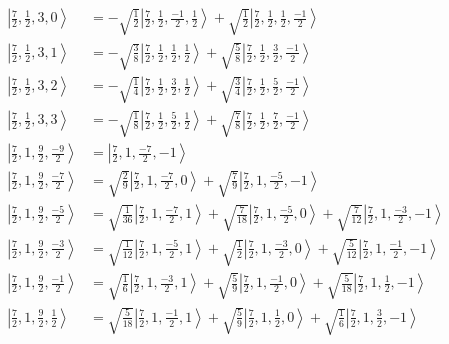 \documentclass{report}
\newcommand{\ket}[1]{\left| #1 \right>} %
\begin{document}
\begin{align*}
\ket{ \frac{7}{2} ,  \frac{1}{2} ,  3 ,  0  } &=  - \sqrt{  \frac{1}{2}  } \ket{ \frac{7}{2} ,  \frac{1}{2} ,  \frac{-1}{2} ,  \frac{1}{2}  } + \sqrt{  \frac{1}{2}  } \ket{ \frac{7}{2} ,  \frac{1}{2} ,  \frac{1}{2} ,  \frac{-1}{2}  } \\
\ket{ \frac{7}{2} ,  \frac{1}{2} ,  3 ,  1  } &=  - \sqrt{  \frac{3}{8}  } \ket{ \frac{7}{2} ,  \frac{1}{2} ,  \frac{1}{2} ,  \frac{1}{2}  } + \sqrt{  \frac{5}{8}  } \ket{ \frac{7}{2} ,  \frac{1}{2} ,  \frac{3}{2} ,  \frac{-1}{2}  } \\
\ket{ \frac{7}{2} ,  \frac{1}{2} ,  3 ,  2  } &=  - \sqrt{  \frac{1}{4}  } \ket{ \frac{7}{2} ,  \frac{1}{2} ,  \frac{3}{2} ,  \frac{1}{2}  } + \sqrt{  \frac{3}{4}  } \ket{ \frac{7}{2} ,  \frac{1}{2} ,  \frac{5}{2} ,  \frac{-1}{2}  } \\
\ket{ \frac{7}{2} ,  \frac{1}{2} ,  3 ,  3  } &=  - \sqrt{  \frac{1}{8}  } \ket{ \frac{7}{2} ,  \frac{1}{2} ,  \frac{5}{2} ,  \frac{1}{2}  } + \sqrt{  \frac{7}{8}  } \ket{ \frac{7}{2} ,  \frac{1}{2} ,  \frac{7}{2} ,  \frac{-1}{2}  } \\
\ket{ \frac{7}{2} ,  1 ,  \frac{9}{2} ,  \frac{-9}{2}  } &=  \ket{ \frac{7}{2} ,  1 ,  \frac{-7}{2} ,  -1  } \\
\ket{ \frac{7}{2} ,  1 ,  \frac{9}{2} ,  \frac{-7}{2}  } &=  \sqrt{  \frac{2}{9}  } \ket{ \frac{7}{2} ,  1 ,  \frac{-7}{2} ,  0  } + \sqrt{  \frac{7}{9}  } \ket{ \frac{7}{2} ,  1 ,  \frac{-5}{2} ,  -1  } \\
\ket{ \frac{7}{2} ,  1 ,  \frac{9}{2} ,  \frac{-5}{2}  } &=  \sqrt{  \frac{1}{36}  } \ket{ \frac{7}{2} ,  1 ,  \frac{-7}{2} ,  1  } + \sqrt{  \frac{7}{18}  } \ket{ \frac{7}{2} ,  1 ,  \frac{-5}{2} ,  0  } + \sqrt{  \frac{7}{12}  } \ket{ \frac{7}{2} ,  1 ,  \frac{-3}{2} ,  -1  } \\
\ket{ \frac{7}{2} ,  1 ,  \frac{9}{2} ,  \frac{-3}{2}  } &=  \sqrt{  \frac{1}{12}  } \ket{ \frac{7}{2} ,  1 ,  \frac{-5}{2} ,  1  } + \sqrt{  \frac{1}{2}  } \ket{ \frac{7}{2} ,  1 ,  \frac{-3}{2} ,  0  } + \sqrt{  \frac{5}{12}  } \ket{ \frac{7}{2} ,  1 ,  \frac{-1}{2} ,  -1  } \\
\ket{ \frac{7}{2} ,  1 ,  \frac{9}{2} ,  \frac{-1}{2}  } &=  \sqrt{  \frac{1}{6}  } \ket{ \frac{7}{2} ,  1 ,  \frac{-3}{2} ,  1  } + \sqrt{  \frac{5}{9}  } \ket{ \frac{7}{2} ,  1 ,  \frac{-1}{2} ,  0  } + \sqrt{  \frac{5}{18}  } \ket{ \frac{7}{2} ,  1 ,  \frac{1}{2} ,  -1  } \\
\ket{ \frac{7}{2} ,  1 ,  \frac{9}{2} ,  \frac{1}{2}  } &=  \sqrt{  \frac{5}{18}  } \ket{ \frac{7}{2} ,  1 ,  \frac{-1}{2} ,  1  } + \sqrt{  \frac{5}{9}  } \ket{ \frac{7}{2} ,  1 ,  \frac{1}{2} ,  0  } + \sqrt{  \frac{1}{6}  } \ket{ \frac{7}{2} ,  1 ,  \frac{3}{2} ,  -1  } \\

\end{align*}
\end{document}

